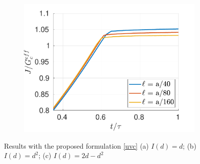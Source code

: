 \begin{figure}[h]
\begin{subfigure}{.33\textwidth}
  \includegraphics[width=\linewidth]{images/2d_propagation/zoom_gary_I_2d.pdf}
  \caption{}
  \label{fig:prop_gary_2d}
\end{subfigure}
  \caption{Results with the proposed formulation \eqref{uvc} (a) $I(d) = d$; (b) $I(d) = d^2$; (c) $I(d) = 2d-d^2$  } 
  \label{fig:prop_gary}
\end{figure}




